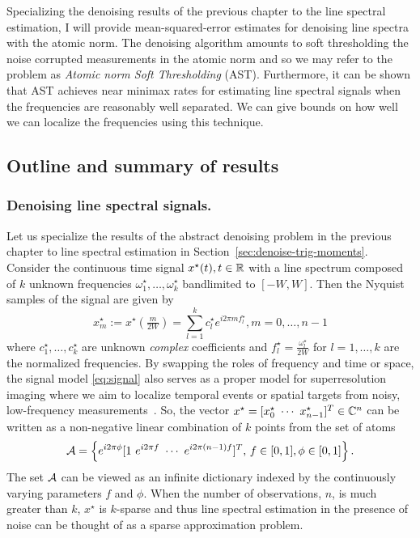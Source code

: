 Specializing the denoising results of the previous chapter to the line spectral
estimation, I will provide mean-squared-error estimates for denoising line
spectra with the atomic norm. The denoising algorithm amounts to soft
thresholding the noise corrupted measurements in the atomic norm and so we may
refer to the problem as \emph{Atomic norm Soft Thresholding} (AST). Furthermore,
it can be shown that AST achieves near minimax rates for estimating line
spectral signals when the frequencies are reasonably well separated. We can
give bounds on how well we can localize the frequencies using this technique.

\subsection{Outline and summary of results} 

\subsubsection{Denoising line spectral signals.} 

Let us specialize the results of the abstract denoising problem in the previous
chapter to line spectral estimation in Section~\ref{sec:denoise-trig-moments}.
Consider the continuous time signal $x^\star(t), t\in \mathbb{R}$ with a line spectrum composed of $k$ unknown frequencies $\omega_1^\star, \ldots, \omega_k^\star$ bandlimited to $[-W,W]$. Then the Nyquist samples of the signal are given by
\begin{equation}
\label{eq:signal}
 x^\star_m := x^\star\left(\tfrac{m}{2W}\right) = \sum_{l=1}^k c_l^\star e^{i 2 \pi m f_l^\star}, m = 0, \ldots, n-1
\end{equation}
where $c_1^\star, \ldots, c_k^\star$ are unknown \emph{complex} coefficients and
$f_l^\star = \tfrac{\omega_l^\star}{2W}$ for $l = 1, \ldots, k$ are the
normalized frequencies. By swapping the roles of frequency and time or space,
the signal model \eqref{eq:signal} also serves as a proper model for
superresolution imaging where we aim to localize temporal events or spatial
targets from noisy, low-frequency measurements~\cite{cg_exact12,cg_noisy}. So,
the vector $x^\star = [x^\star_0 ~ \cdots ~ x^\star_{n-1}]^T \in \mathbb{C}^n$ can be
written as a non-negative linear combination of $k$ points from the set of atoms
\[
\mathcal{A} = \left\{e^{i 2\pi \phi}[1 ~ e^{i2\pi f} ~ \cdots ~ e^{i2\pi (n-1) f}]^T,\, f \in [0,1], \phi \in [0,1] \right\}.
\] 
The set $\mathcal{A}$ can be viewed as an infinite dictionary indexed by the continuously
varying parameters $f$ and $\phi$. When the number of observations, $n$, is much
greater than $k$, $x^\star$ is $k$-sparse and thus line spectral estimation in
the presence of noise can be thought of as a sparse approximation problem. 

